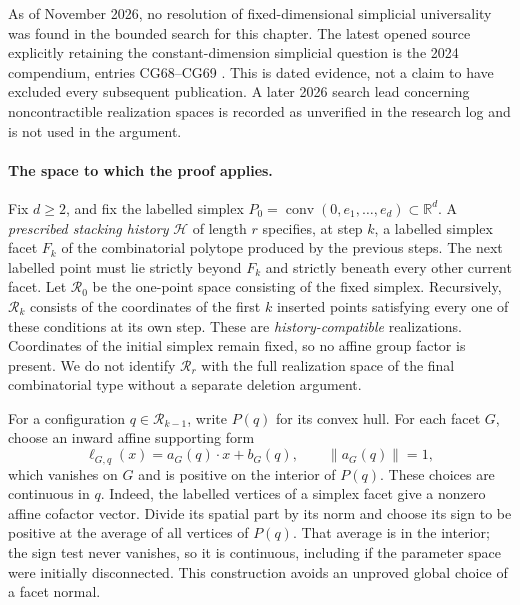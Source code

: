 As of November 2026, no resolution of fixed-dimensional simplicial
universality was found in the bounded search for this chapter. The latest
opened source explicitly retaining the constant-dimension simplicial
question is the 2024 compendium, entries CG68--CG69
\citep{schaefercardinalmiltzow2024existential}. This is dated evidence, not a
claim to have excluded every subsequent publication. A later 2026 search
lead concerning noncontractible realization spaces is recorded as
unverified in the research log and is not used in the argument.

\paragraph{The space to which the proof applies.}
Fix \(d\geq2\), and fix the labelled simplex
\(P_0=\operatorname{conv}(0,e_1,\ldots,e_d)\subset\mathbb R^d\).
A \emph{prescribed stacking history} \(\mathcal H\) of length \(r\) specifies,
at step \(k\), a labelled simplex facet \(F_k\) of the combinatorial polytope
produced by the previous steps. The next labelled point must lie strictly
beyond \(F_k\) and strictly beneath every other current facet.
Let \(\mathcal R_0\) be the one-point space consisting of the fixed simplex.
Recursively, \(\mathcal R_k\) consists of the coordinates of the first \(k\)
inserted points satisfying every one of these conditions at its own step.
These are \emph{history-compatible} realizations. Coordinates of the initial
simplex remain fixed, so no affine group factor is present. We do not
identify \(\mathcal R_r\) with the full realization space of the final
combinatorial type without a separate deletion argument.

For a configuration \(q\in\mathcal R_{k-1}\), write \(P(q)\) for its convex
hull. For each facet \(G\), choose an inward affine supporting form
\[
  \ell_{G,q}(x)=a_G(q)\cdot x+b_G(q),\qquad
  \|a_G(q)\|=1,
\]
which vanishes on \(G\) and is positive on the interior of \(P(q)\).
These choices are continuous in \(q\). Indeed, the labelled vertices of a
simplex facet give a nonzero affine cofactor vector. Divide its spatial
part by its norm and choose its sign to be positive at the average of all
vertices of \(P(q)\). That average is in the interior; the sign test never
vanishes, so it is continuous, including if the parameter space were
initially disconnected. This construction avoids an unproved global
choice of a facet normal.

